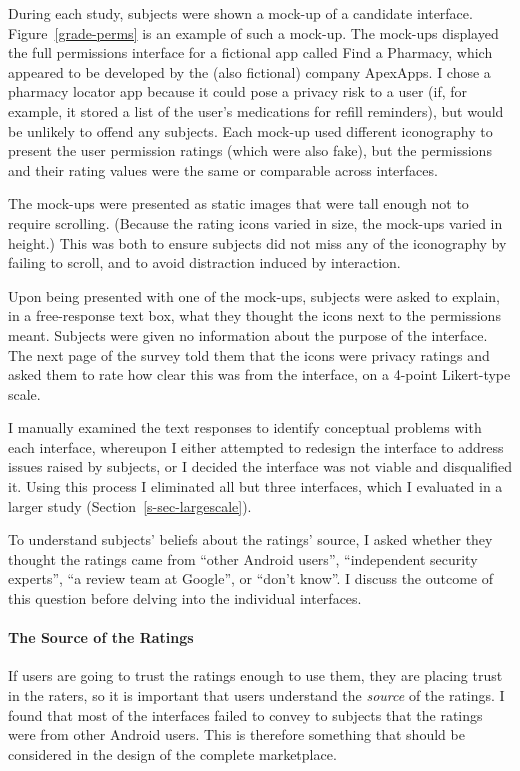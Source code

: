 \documentclass[11pt]{article}
\newcommand{\reffig}[1]{Figure~\ref{#1}}
\newcommand{\refsec}[1]{Section~\ref{#1}}
\begin{document}
During each study, subjects were shown a mock-up of
a candidate interface. \reffig{grade-perms}
is an example of such a mock-up. The mock-ups displayed the full permissions
interface for a fictional app called Find a Pharmacy, which appeared 
to be developed by the (also fictional) company ApexApps. 
I chose a pharmacy locator app because it 
could pose a privacy risk to a user (if, for example, it stored a list
of the user's medications for refill reminders), but 
would be unlikely to offend any 
subjects. Each mock-up used different iconography to
present the user permission ratings (which were also fake), but the permissions
and their rating values were the same or comparable across interfaces. 

The mock-ups were presented as static images that were tall enough
not to require scrolling. (Because the rating icons
varied in size, the mock-ups varied in height.) This was both
to ensure subjects did not miss any of the iconography by failing to
scroll, and to avoid distraction induced by interaction.

Upon being presented with one of the mock-ups, subjects were
asked to explain, in a free-response text box, 
what they thought the icons next to the permissions 
meant. Subjects were given no information about the 
purpose of the interface. The next page of the survey 
told them that the icons were privacy 
ratings and asked them to rate how clear this was from 
the interface, on a 4-point Likert-type scale. 

I manually examined 
the text responses to identify conceptual problems with each 
interface, whereupon I either attempted 
to redesign the interface to address issues raised by subjects, 
or I decided the interface was not viable and disqualified it.
Using this process I eliminated all but three interfaces, which I evaluated
in a larger study (\refsec{s-sec-largescale}).

To understand subjects' beliefs about the ratings' source, I asked
whether they thought the ratings came from 
 ``other Android users'', ``independent 
security experts'', ``a review team at Google'', or
``don't know''. I discuss the outcome of this question
before delving into the individual interfaces.


\paragraph{The Source of the Ratings}
\label{subsec-small-source}

If users are going to trust the ratings enough to use them, 
they are placing trust in the raters, so it is
important that users understand the \emph{source}
of the ratings. 
I found that most of the interfaces failed to
convey to subjects that the ratings were from other Android users.
This is therefore something that should be considered in the 
design of the complete marketplace.
\end{document}
